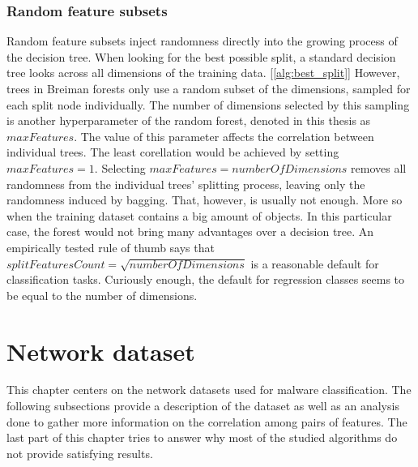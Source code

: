 \documentclass[11pt]{article}
\begin{document}
      \subsubsection{Random feature subsets}
        Random feature subsets inject randomness directly into the growing process of the decision tree. When looking for the best possible split, a standard decision tree looks across all dimensions of the training data. [\ref{alg:best_split}] However, trees in Breiman forests only use a random subset of the dimensions, sampled for each split node individually. The number of dimensions selected by this sampling is another hyperparameter of the random forest, denoted in this thesis as $maxFeatures$. The value of this parameter affects the correlation between individual trees. \cite{brabec} The least corellation would be achieved by setting $maxFeatures = 1$. Selecting $maxFeatures = numberOfDimensions$ removes all randomness from the individual trees' splitting process, leaving only the randomness induced by bagging. That, however, is usually not enough. More so when the training dataset contains a big amount of objects. In this particular case, the forest would not bring many advantages over a decision tree. An empirically tested rule of thumb says that $splitFeaturesCount = \sqrt{numberOfDimensions}$ is a reasonable default for classification tasks. \cite{ert} Curiously enough, the default for regression classes seems to be equal to the number of dimensions. \cite{ert}
  \newpage
  \section{Network dataset}
    \label{sec:datadesc}
    This chapter centers on the network datasets used for malware classification. The following subsections provide a description of the dataset as well as an analysis done to gather more information on the correlation among pairs of features. The last part of this chapter tries to answer why most of the studied algorithms do not provide satisfying results.
\end{document}
